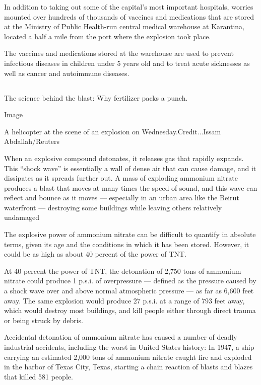 In addition to taking out some of the capital's most important
hospitals, worries mounted over hundreds of thousands of vaccines and
medications that are stored at the Ministry of Public Health-run central
medical warehouse at Karantina, located a half a mile from the port
where the explosion took place.

The vaccines and medications stored at the warehouse are used to prevent
infectious diseases in children under 5 years old and to treat acute
sicknesses as well as cancer and autoimmune diseases.

\hypertarget{-2}{%
\subsection{}\label{-2}}

The science behind the blast: Why fertilizer packs a punch.

Image

A helicopter at the scene of an explosion on Wednesday.Credit...Issam
Abdallah/Reuters

When an explosive compound detonates, it releases gas that rapidly
expands. This ``shock wave'' is essentially a wall of dense air that can
cause damage, and it dissipates as it spreads further out. A mass of
exploding ammonium nitrate produces a blast that moves at many times the
speed of sound, and this wave can reflect and bounce as it moves ---
especially in an urban area like the Beirut waterfront --- destroying
some buildings while leaving others relatively undamaged

The explosive power of ammonium nitrate can be difficult to quantify in
absolute terms, given its age and the conditions in which it has been
stored. However, it could be as high as about 40 percent of the power of
TNT.

At 40 percent the power of TNT, the detonation of 2,750 tons of ammonium
nitrate could produce 1 p.s.i. of overpressure --- defined as the
pressure caused by a shock wave over and above normal atmospheric
pressure --- as far as 6,600 feet away. The same explosion would produce
27 p.s.i. at a range of 793 feet away, which would destroy most
buildings, and kill people either through direct trauma or being struck
by debris.

Accidental detonation of ammonium nitrate has caused a number of deadly
industrial accidents, including the worst in United States history: In
1947, a ship carrying an estimated 2,000 tons of ammonium nitrate caught
fire and exploded in the harbor of Texas City, Texas, starting a chain
reaction of blasts and blazes that killed 581 people.


